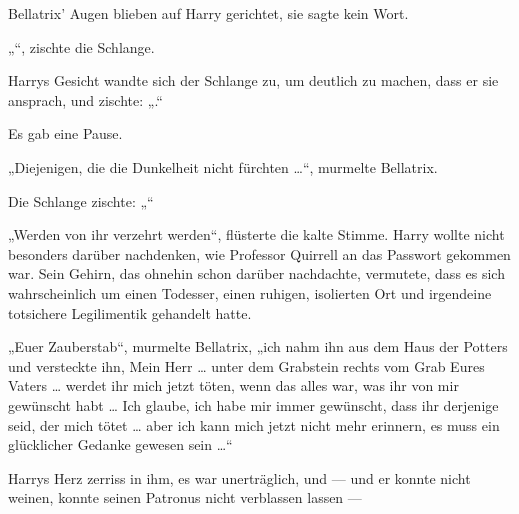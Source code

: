 Bellatrix’ Augen blieben auf Harry gerichtet, sie sagte kein Wort.

„“, zischte die Schlange.

Harrys Gesicht wandte sich der Schlange zu, um deutlich zu machen, dass er sie ansprach, und zischte: „.“

Es gab eine Pause.

„Diejenigen, die die Dunkelheit nicht fürchten …“, murmelte Bellatrix.

Die Schlange zischte: „“

„Werden von ihr verzehrt werden“, flüsterte die kalte Stimme. Harry wollte nicht besonders darüber nachdenken, wie Professor Quirrell an das Passwort gekommen war. Sein Gehirn, das ohnehin schon darüber nachdachte, vermutete, dass es sich wahrscheinlich um einen Todesser, einen ruhigen, isolierten Ort und irgendeine totsichere Legilimentik gehandelt hatte.

„Euer Zauberstab“, murmelte Bellatrix, „ich nahm ihn aus dem Haus der Potters und versteckte ihn, Mein Herr … unter dem Grabstein rechts vom Grab Eures Vaters … werdet ihr mich jetzt töten, wenn das alles war, was ihr von mir gewünscht habt … Ich glaube, ich habe mir immer gewünscht, dass ihr derjenige seid, der mich tötet … aber ich kann mich jetzt nicht mehr erinnern, es muss ein glücklicher Gedanke gewesen sein …“

Harrys Herz zerriss in ihm, es war unerträglich, und — und er konnte nicht weinen, konnte seinen Patronus nicht verblassen lassen —

